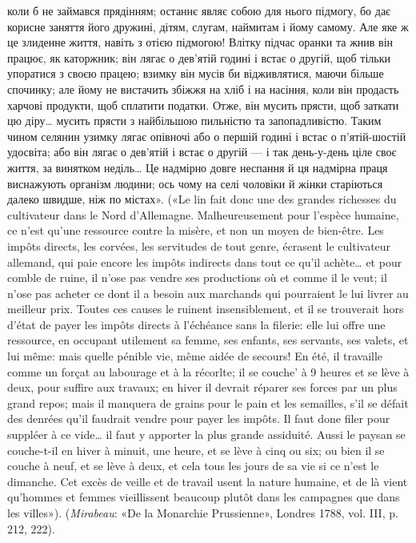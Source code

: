 {коли б не займався прядінням; останнє являє собою для нього підмогу,
бо дає корисне заняття його дружині, дітям, слугам, наймитам і йому
самому. Але яке ж це злиденне життя, навіть з отією підмогою! Влітку
підчас оранки та жнив він працює, як каторжник; він лягає о дев’ятій
годині і встає о другій, щоб тільки упоратися з своєю працею; взимку
він мусів би відживлятися, маючи більше спочинку; але йому не вистачить
збіжжя на хліб і на насіння, коли він продасть харчові продукти,
щоб сплатити податки. Отже, він мусить прясти, щоб заткати цю діру\dots{}
мусить прясти з найбільшою пильністю та запопадливістю. Таким чином
селянин узимку лягає опівночі або о першій годині і встає о п’ятій-шостій
удосвіта; або він лягає о дев’ятій і встає о другій — і так день-у-день
ціле своє життя, за винятком неділь\dots{} Це надмірно довге неспання й ця
надмірна праця виснажують організм людини; ось чому на селі чоловіки
й жінки старіються далеко швидше, ніж по містах». («Le lin fait donc
une des grandes richesses du cultivateur dans le Nord d’Allemagne. Malheureusement
pour l’espèce humaine, ce n’est qu’une ressource contre la
misère, et non un moyen de bien-être. Les impôts directs, les corvées, les
servitudes de tout genre, écrasent le cultivateur allemand, qui paie encore
les impôts indirects dans tout ce qu’il achète\dots{} et pour comble de ruine, il
n’ose pas vendre ses productions où et comme il le veut; il n’ose pas acheter
ce dont il a besoin aux marchands qui pourraient le lui livrer au meilleur
prix. Toutes ces causes le ruinent insensiblement, et il se trouverait hors
d'état de payer les impôts directs à l’échéance sans la filerie: elle lui offre
une ressource, en occupant utilement sa femme, ses enfants, ses servants, ses valets,
et lui même: mais quelle pénible vie, même aidée de secours! En été, il
travaille comme un forçat au labourage et à la récorlte; il se couche’ à
9 heures et se lève à deux, pour suffire aux travaux; en hiver il devrait réparer
ses forces par un plus grand repos; mais il manquera de grains pour le
pain et les semailles, s’il se défait des denrées qu’il faudrait vendre pour payer
les impôts. Il faut done filer pour suppléer à ce vide\dots{} il faut y apporter
la plus grande assiduité. Aussi le paysan se couche-t-il en hiver à
minuit, une heure, et se lève à cinq ou six; ou bien il se couche à neuf, et
se lève à deux, et cela tous les jours de sa vie si ce n’est le dimanche. Cet
excès de veille et de travail usent la nature humaine, et de là vient qu’hommes
et femmes vieillissent beaucoup plutôt dans les campagnes que dans
les villes»). (\emph{Mirabeau}: «De la Monarchie Prussienne», Londres 1788,
vol. III, p. 212, 222).

}
